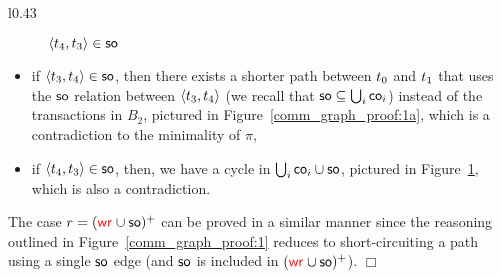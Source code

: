 \begin{wrapfigure}{l}{0.43\textwidth}
\begin{subfigure}{.18\textwidth}
{  
   }
   \caption{${\left\langle{{t}_4,{t}_3}\right\rangle} \in \mathsf{so}$}
   \label{comm_graph_proof:1b}
  \end{subfigure}
   \vspace{-2mm}
  \caption{Minimal paths between transactions in the same biconnected component.}
  \label{comm_graph_proof:1}
 \end{wrapfigure}
 \begin{itemize}
  \item if ${\left\langle{{t}_3, {t}_4}\right\rangle} \in \mathsf{so}$, then there exists a shorter path between ${t}_0$ and ${t}_1$ that uses the $\mathsf{so}$ relation between ${\left\langle{{t}_3, {t}_4}\right\rangle}$ (we recall that $\mathsf{so}\subseteq \bigcup_i \mathsf{co}_i$) instead of the transactions in $B_2$, pictured in Figure~\ref{comm_graph_proof:1a}, which is a contradiction to the minimality of $\pi$,
  \item if ${\left\langle{{t}_4, {t}_3}\right\rangle} \in \mathsf{so}$, then, we have a cycle in ${\bigcup_i \mathsf{co}_i\cup\mathsf{so}}$, pictured in Figure~\ref{comm_graph_proof:1b}, which is also a contradiction.
 \end{itemize}
 
 The case $r=(\textcolor{red}{\mathsf{wr}_{}} \cup \mathsf{so})^+$
 can be proved in a similar manner since the reasoning outlined in Figure~\ref{comm_graph_proof:1} reduces to short-circuiting a path using a single $\mathsf{so}$ edge (and $\mathsf{so}$ is included in $(\textcolor{red}{\mathsf{wr}_{}} \cup \mathsf{so})^+$). \hfill $\Box$
 
%  
  
